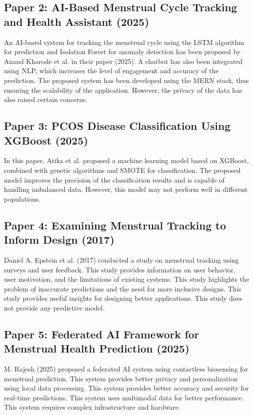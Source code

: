 \subsection{Paper 2: AI-Based Menstrual Cycle Tracking and Health Assistant (2025)}
An AI-based system for tracking the menstrual cycle using the LSTM algorithm for prediction and Isolation Forest for anomaly detection has been proposed by Anand Kharode et al. in their paper (2025). A chatbot has also been integrated using NLP, which increases the level of engagement and accuracy of the prediction. The proposed system has been developed using the MERN stack, thus ensuring the scalability of the application. However, the privacy of the data has also raised certain concerns. \cite{soni2025}

\subsection{Paper 3: PCOS Disease Classification Using XGBoost (2025)}
In this paper, Atika et al. proposed a machine learning model based on XGBoost, combined with genetic algorithms and SMOTE for classification. The proposed model improves the precision of the classification results and is capable of handling imbalanced data. However, this model may not perform well in different populations. \cite{ahmed2023}

\subsection{Paper 4: Examining Menstrual Tracking to Inform Design (2017)}
Daniel A. Epstein et al. (2017) conducted a study on menstrual tracking using surveys and user feedback. This study provides information on user behavior, user motivation, and the limitations of existing systems. This study highlights the problem of inaccurate predictions and the need for more inclusive designs. This study provides useful insights for designing better applications. This study does not provide any predictive model. \cite{epstein2017,liu2019}

\subsection{Paper 5: Federated AI Framework for Menstrual Health Prediction (2025)}
M. Rajesh (2025) proposed a federated AI system using contactless biosensing for menstrual prediction. This system provides better privacy and personalization using local data processing. This system provides better accuracy and security for real-time predictions. This system uses multimodal data for better performance. This system requires complex infrastructure and hardware. \cite{rajesh2025}

